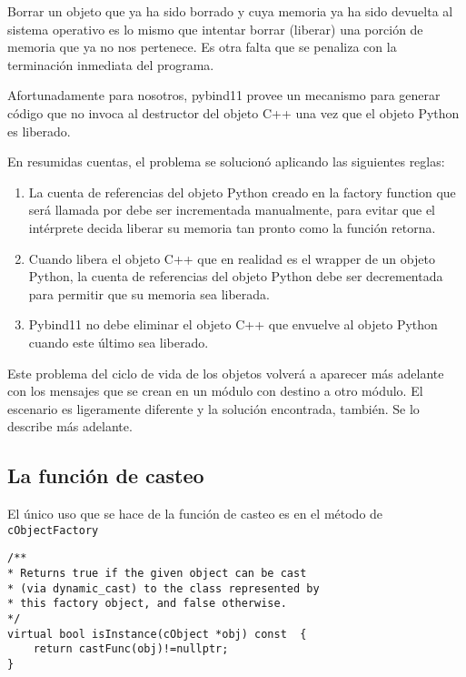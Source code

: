 Borrar un objeto que ya ha sido borrado y cuya memoria ya ha sido devuelta al
sistema operativo es lo mismo que intentar borrar (liberar) una porción de
memoria que ya no nos pertenece. Es otra falta que se penaliza con la
terminación inmediata del programa.

Afortunadamente para nosotros, pybind11 provee un mecanismo para generar código
que no invoca al destructor del objeto C++ una vez que el objeto Python es
liberado.

En resumidas cuentas, el problema se solucionó aplicando las siguientes reglas:

\begin{enumerate}
    \item La cuenta de referencias del objeto Python creado en la factory
function que será llamada por \omnetpp{} debe ser incrementada manualmente,
para evitar que el intérprete decida liberar su memoria tan pronto como la
función retorna.

    \item Cuando \omnetpp{} libera el objeto C++ que en realidad es el wrapper
de un objeto Python, la cuenta de referencias del objeto Python debe ser
decrementada para permitir que su memoria sea liberada.

    \item Pybind11 no debe eliminar el objeto C++ que envuelve al objeto Python
cuando este último sea liberado.
\end{enumerate}

Este problema del ciclo de vida de los objetos volverá a aparecer más adelante
con los mensajes que se crean en un módulo con destino a otro módulo. El
escenario es ligeramente diferente y la solución encontrada, también. Se lo
describe más adelante.

\subsection{La función de casteo}

El único uso que se hace de la función de casteo es en el método de
\verb!cObjectFactory!

\begin{verbatim}
/**
* Returns true if the given object can be cast
* (via dynamic_cast) to the class represented by
* this factory object, and false otherwise.
*/
virtual bool isInstance(cObject *obj) const  {
    return castFunc(obj)!=nullptr;
}
\end{verbatim}

